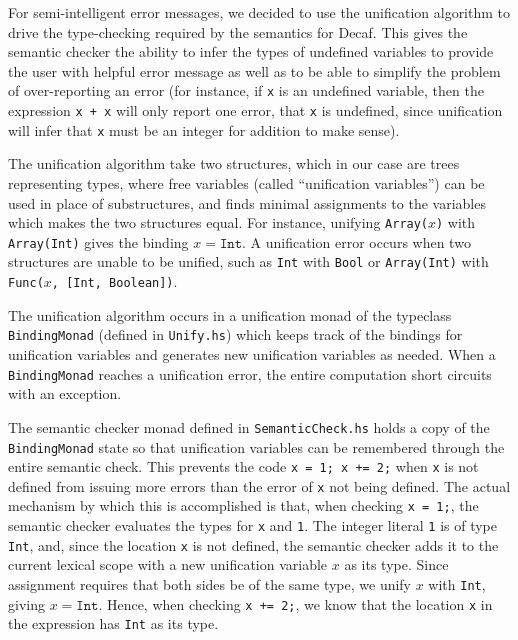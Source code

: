 \documentclass[11pt]{article}
\begin{document}
For semi-intelligent error messages, we decided to use the unification
algorithm to drive the type-checking required by the semantics for
Decaf.  This gives the semantic checker the ability to infer the types
of undefined variables to provide the user with helpful error message
as well as to be able to simplify the problem of over-reporting an
error (for instance, if \texttt{x} is an undefined variable, then the
expression \texttt{x + x} will only report one error, that \texttt{x}
is undefined, since unification will infer that \texttt{x} must be an
integer for addition to make sense).

The unification algorithm take two structures, which in our case are
trees representing types, where free variables (called ``unification
variables'') can be used in place of substructures, and finds minimal
assignments to the variables which makes the two structures equal.
For instance, unifying \texttt{Array($x$)} with \texttt{Array(Int)}
gives the binding $x=\mathtt{Int}$.  A unification error occurs when
two structures are unable to be unified, such as \texttt{Int} with
\texttt{Bool} or \texttt{Array(Int)} with \texttt{Func($x$, [Int,
  Boolean])}.

The unification algorithm occurs in a unification monad of the
typeclass \texttt{BindingMonad} (defined in \texttt{Unify.hs}) which
keeps track of the bindings for unification variables and generates
new unification variables as needed.  When a \texttt{BindingMonad}
reaches a unification error, the entire computation short circuits
with an exception.

The semantic checker monad defined in \texttt{SemanticCheck.hs} holds
a copy of the \texttt{BindingMonad} state so that unification
variables can be remembered through the entire semantic check.  This
prevents the code \texttt{x = 1; x += 2;} when \texttt{x} is not
defined from issuing more errors than the error of \texttt{x} not
being defined.  The actual mechanism by which this is accomplished is
that, when checking \texttt{x = 1;}, the semantic checker evaluates
the types for \texttt{x} and \texttt{1}.  The integer literal
\texttt{1} is of type \texttt{Int}, and, since the location \texttt{x}
is not defined, the semantic checker adds it to the current lexical
scope with a new unification variable $x$ as its type.  Since
assignment requires that both sides be of the same type, we unify $x$
with \texttt{Int}, giving $x=\mathtt{Int}$.  Hence, when checking
\texttt{x += 2;}, we know that the location \texttt{x} in the
expression has \texttt{Int} as its type.
\end{document}
